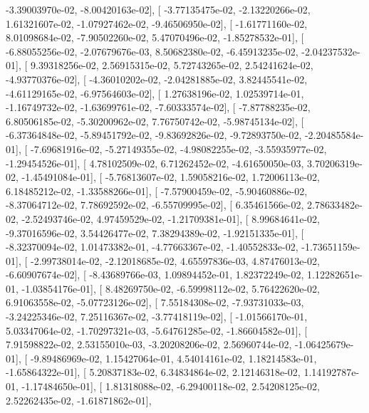 \documentclass{article}
\begin{document}
         -3.39003970e-02,  -8.00420163e-02],
       [ -3.77135475e-02,  -2.13220266e-02,   1.61321607e-02,
         -1.07927462e-02,  -9.46506950e-02],
       [ -1.61771160e-02,   8.01098684e-02,  -7.90502260e-02,
          5.47070496e-02,  -1.85278532e-01],
       [ -6.88055256e-02,  -2.07679676e-03,   8.50682380e-02,
         -6.45913235e-02,  -2.04237532e-01],
       [  9.39318256e-02,   2.56915315e-02,   5.72743265e-02,
          2.54241624e-02,  -4.93770376e-02],
       [ -4.36010202e-02,  -2.04281885e-02,   3.82445541e-02,
         -4.61129165e-02,  -6.97564603e-02],
       [  1.27638196e-02,   1.02539714e-01,  -1.16749732e-02,
         -1.63699761e-02,  -7.60333574e-02],
       [ -7.87788235e-02,   6.80506185e-02,  -5.30200962e-02,
          7.76750742e-02,  -5.98745134e-02],
       [ -6.37364848e-02,  -5.89451792e-02,  -9.83692826e-02,
         -9.72893750e-02,  -2.20485584e-01],
       [ -7.69681916e-02,  -5.27149355e-02,  -4.98082255e-02,
         -3.55935977e-02,  -1.29454526e-01],
       [  4.78102509e-02,   6.71262452e-02,  -4.61650050e-03,
          3.70206319e-02,  -1.45491084e-01],
       [ -5.76813607e-02,   1.59058216e-02,   1.72006113e-02,
          6.18485212e-02,  -1.33588266e-01],
       [ -7.57900459e-02,  -5.90460886e-02,  -8.37064712e-02,
          7.78692592e-02,  -6.55709995e-02],
       [  6.35461566e-02,   2.78633482e-02,  -2.52493746e-02,
          4.97459529e-02,  -1.21709381e-01],
       [  8.99684641e-02,  -9.37016596e-02,   3.54426477e-02,
          7.38294389e-02,  -1.92151335e-01],
       [ -8.32370094e-02,   1.01473382e-01,  -4.77663367e-02,
         -1.40552833e-02,  -1.73651159e-01],
       [ -2.99738014e-02,  -2.12018685e-02,   4.65597836e-03,
          4.87476013e-02,  -6.60907674e-02],
       [ -8.43689766e-03,   1.09894452e-01,   1.82372249e-02,
          1.12282651e-01,  -1.03854176e-01],
       [  8.48269750e-02,  -6.59998112e-02,   5.76422620e-02,
          6.91063558e-02,  -5.07723126e-02],
       [  7.55184308e-02,  -7.93731033e-03,  -3.24225346e-02,
          7.25116367e-02,  -3.77418119e-02],
       [ -1.01566170e-01,   5.03347064e-02,  -1.70297321e-03,
         -5.64761285e-02,  -1.86604582e-01],
       [  7.91598822e-02,   2.53155010e-03,  -3.20208206e-02,
          2.56960744e-02,  -1.06425679e-01],
       [ -9.89486969e-02,   1.15427064e-01,   4.54014161e-02,
          1.18214583e-01,  -1.65864322e-01],
       [  5.20837183e-02,   6.34834864e-02,   2.12146318e-02,
          1.14192787e-01,  -1.17484650e-01],
       [  1.81318088e-02,  -6.29400118e-02,   2.54208125e-02,
          2.52262435e-02,  -1.61871862e-01],
\end{document}
